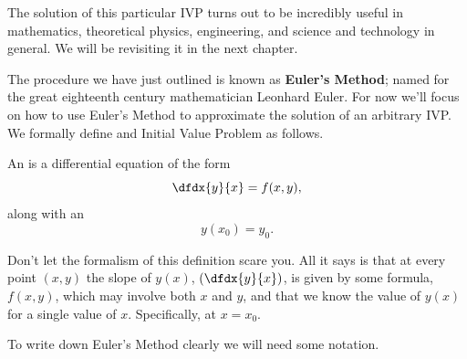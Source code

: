 

The solution of this particular IVP  turns out to be
incredibly useful in mathematics, theoretical physics, engineering,
and science and technology in general.  We will be revisiting it in
the next chapter.

The procedure we have just outlined is known as {\bf Euler's Method};
named for the great eighteenth century mathematician Leonhard
Euler. For now we'll focus on how to use Euler's Method to approximate the
solution of an arbitrary IVP. We formally define and Initial Value
Problem as follows.

\begin{mydefinition}
  \label{def:IVP}
  An  is a differential equation of the
  form $$\dfdx{y}{x}=f(x,y),$$ along with an  $$y(x_0)=y_0.$$
\end{mydefinition}

Don't let the formalism of this definition scare you. All it says is
that at every point $(x,y)$ the slope of $y(x)$,
$\left(\dfdx{y}{x}\right)$, is given by some formula, $f(x,y)$,
which may involve both $x$ and $y$, and that we know the value of $y(x)$ for a 
single value of $x$. Specifically, at  $x=x_0$.

To write down Euler's Method clearly we will need some
notation.  %



